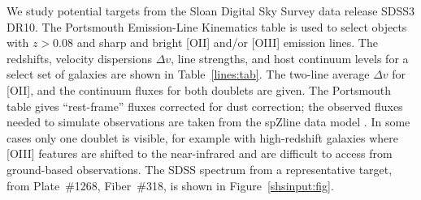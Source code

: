 \documentclass[preprint2, 10pt]{aastex}
\begin{document}
We study potential targets from the Sloan Digital Sky Survey data release SDSS3 DR10.  The  Portsmouth Emission-Line Kinematics table \citep{2013MNRAS.431.1383T}  is used to select
objects 
with $z>0.08$
and sharp and bright [OII] and/or [OIII] emission lines.
The redshifts, velocity dispersions $\Delta v$, line strengths, and host continuum levels for a select set of galaxies are shown in Table~\ref{lines:tab}. 
The two-line average $\Delta v$ for [OII], and the continuum fluxes for both doublets  are given.
The Portsmouth table  gives ``rest-frame'' fluxes corrected for dust correction;
the observed fluxes needed to simulate observations are taken from the spZline data model
\citep{2012AJ....144..144B}.  In some cases only one doublet is visible, for example with high-redshift galaxies where [OIII] features are shifted to the near-infrared and are difficult to access from ground-based observations.
The SDSS spectrum from a representative 
target, from Plate~\#1268, Fiber~\#318, is shown in Figure~\ref{shsinput:fig}. 
\end{document}
